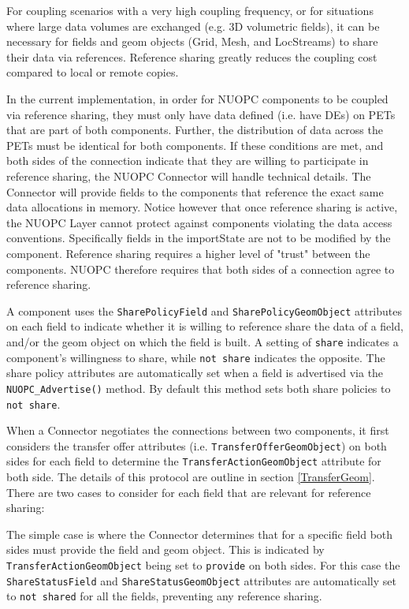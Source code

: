 %

\label{Sharing}

For coupling scenarios with a very high coupling frequency, or for situations where large data volumes are exchanged (e.g. 3D volumetric fields), it can be necessary for fields and geom objects (Grid, Mesh, and LocStreams) to share their data via references. Reference sharing greatly reduces the coupling cost compared to local or remote copies.

In the current implementation, in order for NUOPC components to be coupled via reference sharing, they must only have data defined (i.e. have DEs) on PETs that are part of both components. Further, the distribution of data across the PETs must be identical for both components. If these conditions are met, and both sides of the connection indicate that they are willing to participate in reference sharing, the NUOPC Connector will handle technical details. The Connector will provide fields to the components that reference the exact same data allocations in memory. Notice however that once reference sharing is active, the NUOPC Layer cannot protect against components violating the data access conventions. Specifically fields in the importState are not to be modified by the component. Reference sharing requires a higher level of "trust" between the components. NUOPC therefore requires that both sides of a connection agree to reference sharing.

A component uses the {\tt SharePolicyField} and {\tt SharePolicyGeomObject} attributes on each field to indicate whether it is willing to reference share the data of a field, and/or the geom object on which the field is built. A setting of {\tt share} indicates a component's willingness to share, while {\tt not share} indicates the opposite. The share policy attributes are automatically set when a field is advertised via the {\tt NUOPC\_Advertise()} method. By default this method sets both share policies to {\tt not share}.

When a Connector negotiates the connections between two components, it first considers the transfer offer attributes (i.e. {\tt TransferOfferGeomObject}) on both sides for each field to determine the {\tt TransferActionGeomObject} attribute for both side. The details of this protocol are outline in section \ref{TransferGeom}. There are two cases to consider for each field that are relevant for reference sharing:

The simple case is where the Connector determines that for a specific field both sides must provide the field and geom object. This is indicated by {\tt TransferActionGeomObject} being set to {\tt provide} on both sides. For this case the {\tt ShareStatusField} and {\tt ShareStatusGeomObject} attributes are automatically set to {\tt not shared} for all the fields, preventing any reference sharing.

